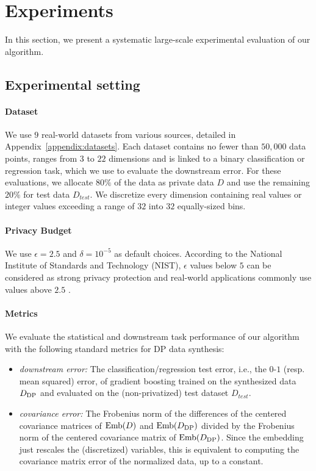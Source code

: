 \section{Experiments}
\label{sec:experiments}
In this section, we present a systematic large-scale experimental evaluation of our algorithm.
\subsection{Experimental setting}
\label{subsec:expsetting}
\paragraph{Dataset} 
We use $9$ real-world datasets from various sources, detailed in Appendix~\ref{appendix:datasets}. Each dataset contains no fewer than $50,000$ data points, ranges from $3$ to $22$ dimensions and is linked to a binary classification or regression task, which we use to evaluate the downstream error. For these evaluations, we allocate $80\%$ of the data as private data $D$ and use the remaining $20\%$ for test data $D_{test}$.  We discretize every dimension containing real values or integer values exceeding a range of $32$ into $32$ equally-sized bins.

\paragraph{Privacy Budget} We use $\epsilon =2.5$ and $\delta =10^{-5}$ as default choices. According to the National Institute of Standards and Technology (NIST), $\epsilon$ values below $5$ can be considered as strong privacy protection and real-world applications commonly use values above $2.5$ \citep{NIST-diff-privacy}. 


\paragraph{Metrics} We evaluate the statistical and downstream task performance of our algorithm with the following standard metrics for DP data  synthesis:
\begin{itemize}


    \item[1.] \textit{downstream error:} The classification/regression test error, i.e., the $0$-$1$ (resp. mean squared) error, of gradient boosting trained on the synthesized data $D_{\text{DP}}$  and evaluated on the (non-privatized) test dataset $D_{test}$. 
    \item[2.] \textit{covariance error:} The Frobenius norm of the differences of the centered covariance matrices of $\text{Emb}(D) $ and $\text{Emb}(D_{\text{DP}})$ divided by the Frobenius norm of the centered covariance matrix of $\text{Emb}(D_{\text{DP}})$. Since the embedding just rescales the (discretized) variables, this is equivalent to computing the covariance matrix error of the normalized data, up to a constant.
\end{itemize}

